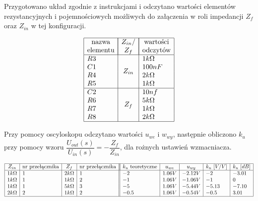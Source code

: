 \documentclass[polish,polish,a4paper]{article}
\begin{document}
\begin{spacing}{1.3}
Przygotowano układ zgodnie z instrukcjami i odczytano wartości elementów rezystancyjnych i pojemnościowych możliwych do załączenia w roli impedancji $Z_{f}$ oraz $Z_{in}$ w tej konfiguracji.

\begin{spacing}{1.5}
	\begin{equation*}
	\begin{array}{|l|c|l|}
	\hline
	\multicolumn{1}{|c|}{$nazwa$}&\multicolumn{1}{|c|}{Z_{in}/}&\multicolumn{1}{|c|}{$wartości$}\\
	\multicolumn{1}{|c|}{$elementu$}&\multicolumn{1}{|c|}{Z_{f}}&\multicolumn{1}{|c|}{$odczytów$}\\
	\hline
	R3&\multirow{4}{*}{$Z_{in}$}&1k\Omega\\
	C1&&100nF\\
	R4&&2k\Omega\\
	R5&&1k\Omega\\\hline
	C2&\multirow{4}{*}{$Z_{f}$}&10nf\\
	R6&&5k\Omega\\
	R7&&1k\Omega\\
	R8&&2k\Omega\\\hline
	\end{array}
	\end{equation*}
\end{spacing}

Przy pomocy oscyloskopu odczytano wartości $u_{we}$ i $w_{wy}$, następnie obliczono $k_{u}$ przy pomocy wzoru $\dfrac{U_{out}(s)}{U_{in}(s)} = - \dfrac{Z_{f}}{Z_{in}}$, dla rożnych ustawień wzmacniacza.

\begin{spacing}{1.8}
	\begin{equation*}
	\begin{array}{|l|l|l|l||l|l|l|l|l|}
	\hline
	\multicolumn{1}{|c|}{Z_{in}}&\multicolumn{1}{c|}{$nr przełącznika$}&\multicolumn{1}{c|}{Z_{f}}&\multicolumn{1}{c||}{$nr przełącznika$}&
	\multicolumn{1}{|c|}{k_{u} $ teoretyczne$}&\multicolumn{1}{c|}{u_{we}}&\multicolumn{1}{c|}{u_{wy}}&\multicolumn{1}{c|}{k_{u}$ $ [V/V]}&\multicolumn{1}{c|}{k_{u} $ $ [dB]}\\
	\hline
	1k\Omega&1&2k\Omega&1&-2&1.06V&-2.12V&-2&-3.01\\
	1k\Omega&1&1k\Omega&2&-1&1.06V&-1.06V&-1&0\\
	1k\Omega&1&5k\Omega&3&-5&1.06V&-5.44V&-5.13&-7.10\\
	2k\Omega&2&1k\Omega&2&-0.5&1.06V&-0.54V&-0.5&3.01\\
	\hline
	\end{array}
	\end{equation*}
\end{spacing}




\end{spacing}
\end{document}
